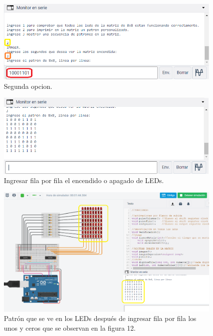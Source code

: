 \documentclass{article}
\begin{document}
\begin{enumerate}
\begin{figure}[h]
\includegraphics[scale=0.6]{opc2.png}
\centering
\caption{Segunda opcion.}
\label{fig:opcion2}
\end{figure}

\begin{figure}[h]
\includegraphics[scale=0.6]{matrizleds.png}
\centering
\caption{Ingresar fila por fila el encendido o apagado de LEDs.}
\label{fig:matrizleds}
\end{figure}

\newpage
\begin{figure}[h]
\includegraphics[scale=0.5]{patronper.png}
\centering
\caption{Patrón que se ve en los LEDs después de ingresar fila por fila los unos y ceros que se observan en la figura 12.}
\label{fig:patronper}
\end{figure}


\end{enumerate}
\end{document}
